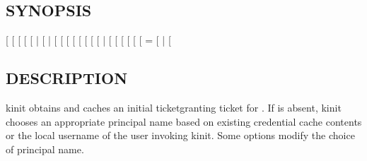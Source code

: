 \documentclass[letterpaper,10pt,english]{sphinxmanual}
\begin{document}
\subsection{SYNOPSIS}
\label{\detokenize{user/user_commands/kinit:synopsis}}
\sphinxAtStartPar
{}
{[}\sphinxstylestrong{\sphinxhyphen{}V}{]}
{[} \sphinxstyleemphasis{lifetime}{]}
{[} \sphinxstyleemphasis{start\_time}{]}
{[} \sphinxstyleemphasis{renewable\_life}{]}
{[} | \sphinxhyphen{}\sphinxstylestrong{P}{]}
{[} | \sphinxhyphen{}\sphinxstylestrong{F}{]}
{[}\sphinxstylestrong{\sphinxhyphen{}a}{]}
{[}\sphinxstylestrong{\sphinxhyphen{}A}{]}
{[}\sphinxstylestrong{\sphinxhyphen{}C}{]}
{[}\sphinxstylestrong{\sphinxhyphen{}E}{]}
{[}\sphinxstylestrong{\sphinxhyphen{}v}{]}
{[}\sphinxstylestrong{\sphinxhyphen{}R}{]}
{[} {[} | \sphinxhyphen{} \sphinxstyleemphasis{keytab\_file}{]}{]}
{[} \sphinxstyleemphasis{cache\_name}{]}
{[}\sphinxstylestrong{\sphinxhyphen{}n}{]}
{[} \sphinxstyleemphasis{service\_name}{]}
{[} \sphinxstyleemphasis{input\_ccache}{]}
{[} \sphinxstyleemphasis{armor\_ccache}{]}
{[} \sphinxstyleemphasis{attribute}{[}=\sphinxstyleemphasis{value}{]}{]}
{[} | \sphinxstylestrong{\textendash{}no\sphinxhyphen{}request\sphinxhyphen{}pac}{]}
{[}\sphinxstyleemphasis{principal}{]}


\subsection{DESCRIPTION}
\label{\detokenize{user/user_commands/kinit:description}}
\sphinxAtStartPar
kinit obtains and caches an initial ticket\sphinxhyphen{}granting ticket for
.  If  is absent, kinit chooses an appropriate
principal name based on existing credential cache contents or the
local username of the user invoking kinit.  Some options modify the
choice of principal name.
\end{document}
